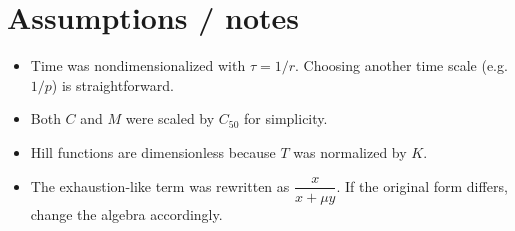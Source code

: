 \documentclass[11pt]{article}
\begin{document}
\bigskip

\section*{Assumptions / notes}
\begin{itemize}
  \item Time was nondimensionalized with \(\tau = 1/r\). Choosing another time scale (e.g. \(1/p\)) is straightforward.
  \item Both \(C\) and \(M\) were scaled by \(C_{50}\) for simplicity.
  \item Hill functions are dimensionless because \(T\) was normalized by \(K\).
  \item The exhaustion-like term was rewritten as \(\dfrac{x}{x+\mu y}\). If the original form differs, change the algebra accordingly.
\end{itemize}
\end{document}
